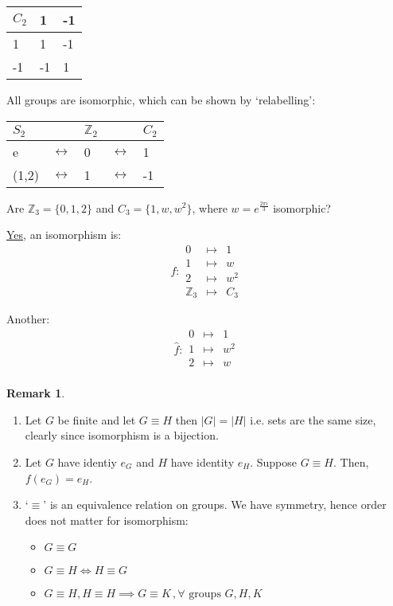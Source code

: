 \documentclass{article}
\theoremstyle{definition}
\newtheorem{remark}{Remark}
\begin{document}
\begin{table}[h]
  \centering
\label{my-label}
\begin{tabular}{l|ll}
  $C_2$  & 1  & -1\\
\hline
1     & 1  & -1 \\
-1    & -1 & 1    
\end{tabular}
\end{table}
All groups are isomorphic, which can be shown by `relabelling': 

\begin{table}[h]
  \centering
\label{my-label}
\begin{tabular}{lllll}
  $S_2$  &  & $\mathbb{Z}_2$ & & $C_2$\\
\hline
e     & $\leftrightarrow$ & 0 & $\leftrightarrow$ & 1 \\
(1,2) & $\leftrightarrow$ & 1 & $\leftrightarrow$ & -1    
\end{tabular}
\end{table}

Are $\mathbb{Z}_3=\{0,1,2\}$ and $C_3=\{1,w,w^2\}$, where $w=e^{\frac{2\pi i}{3}}$ isomorphic?

\underline{Yes}, an isomorphism is:
\begin{equation}
  f : 
       \begin{matrix}
        0 & \mapsto & 1 \\
        1 & \mapsto & w \\
        2 & \mapsto & w^2 \\
        \mathbb{Z}_3 & \mapsto & C_3
      \end{matrix} 
\end{equation}

Another:
\begin{equation}
  \hat{f} :
       \begin{matrix}
        0 & \mapsto & 1 \\
        1 & \mapsto & w^2 \\
        2 & \mapsto & w \\
      \end{matrix} 
\end{equation}

\begin{remark}
\begin{enumerate}
  \item Let $G$ be finite and let $G \equiv H$ then $|G|=|H|$ i.e. sets are the same size, clearly since isomorphism is a bijection.
  \item Let $G$ have identiy $e_G$ and $H$ have identity $e_H$. Suppose $G \equiv H$. Then, $f(e_G)=e_H$.
  \item `$\equiv$' is an equivalence relation on groups.
   We have symmetry, hence order does not matter for isomorphism:
    \begin{itemize}
      \item $G \equiv G$
      \item $G \equiv H \iff H \equiv G$
      \item $G \equiv H, H \equiv H \implies G \equiv K \,, \forall \text{ groups } G,H,K$
    \end{itemize}
\end{enumerate}
\end{remark}
\end{document}
